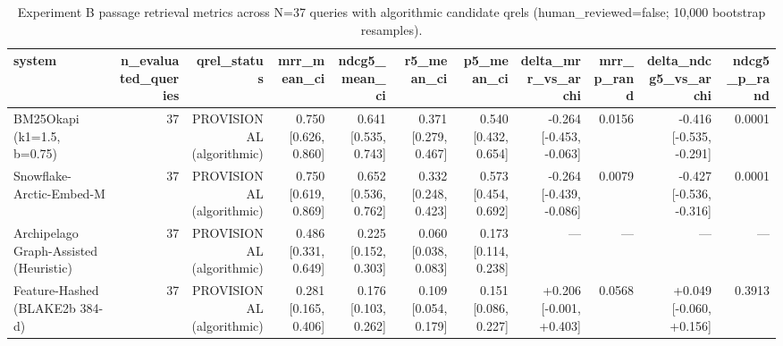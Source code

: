 \begin{table}[t]
\centering
\small
\caption{Experiment B passage retrieval metrics across N=37 queries with algorithmic candidate qrels (human\_reviewed=false; 10,000 bootstrap resamples).}
\label{tab:t4_passage_provisional}
\begin{tabular}{lrrrrrrrrrr}
\toprule
\textbf{system} & \textbf{n\_evaluated\_queries} & \textbf{qrel\_status} & \textbf{mrr\_mean\_ci} & \textbf{ndcg5\_mean\_ci} & \textbf{r5\_mean\_ci} & \textbf{p5\_mean\_ci} & \textbf{delta\_mrr\_vs\_archi} & \textbf{mrr\_p\_rand} & \textbf{delta\_ndcg5\_vs\_archi} & \textbf{ndcg5\_p\_rand} \\
\midrule
BM25Okapi (k1=1.5, b=0.75) & 37 & PROVISIONAL (algorithmic) & 0.750 [0.626, 0.860] & 0.641 [0.535, 0.743] & 0.371 [0.279, 0.467] & 0.540 [0.432, 0.654] & -0.264 [-0.453, -0.063] & 0.0156 & -0.416 [-0.535, -0.291] & 0.0001 \\
Snowflake-Arctic-Embed-M & 37 & PROVISIONAL (algorithmic) & 0.750 [0.619, 0.869] & 0.652 [0.536, 0.762] & 0.332 [0.248, 0.423] & 0.573 [0.454, 0.692] & -0.264 [-0.439, -0.086] & 0.0079 & -0.427 [-0.536, -0.316] & 0.0001 \\
Archipelago Graph-Assisted (Heuristic) & 37 & PROVISIONAL (algorithmic) & 0.486 [0.331, 0.649] & 0.225 [0.152, 0.303] & 0.060 [0.038, 0.083] & 0.173 [0.114, 0.238] & --- & --- & --- & --- \\
Feature-Hashed (BLAKE2b 384-d) & 37 & PROVISIONAL (algorithmic) & 0.281 [0.165, 0.406] & 0.176 [0.103, 0.262] & 0.109 [0.054, 0.179] & 0.151 [0.086, 0.227] & +0.206 [-0.001, +0.403] & 0.0568 & +0.049 [-0.060, +0.156] & 0.3913 \\
\bottomrule
\end{tabular}
\end{table}
